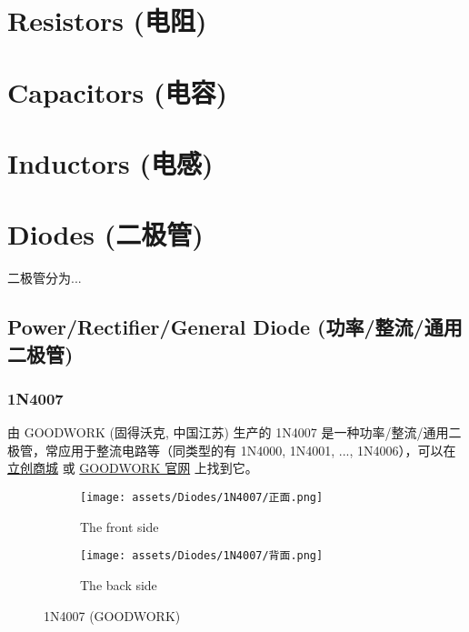 \documentclass[UTF8]{report}
\begin{document}
    \newpage    






\chapter{Resistors (电阻)}\thispagestyle{fancy}


\chapter{Capacitors (电容)}\thispagestyle{fancy}

\chapter{Inductors (电感)}\thispagestyle{fancy}


\chapter{Diodes (二极管)}\thispagestyle{fancy}
二极管分为...

\section{Power/Rectifier/General Diode (功率/整流/通用二极管)}
\subsection{}
\subsection{1N4007}

由 GOODWORK (固得沃克, 中国江苏) 生产的 1N4007 是一种功率/整流/通用二极管，常应用于整流电路等（同类型的有 1N4000, 1N4001, ..., 1N4006），可以在 \href{https://item.szlcsc.com/3428711.html}{立创商城} 或 \href{http://www.gk-goodwork.com/cn/product/1n4007.html}{GOODWORK 官网} 上找到它。
\begin{figure}[H]\centering
\begin{subfigure}[b]{0.5\columnwidth}\centering
    \texttt{[image: assets/Diodes/1N4007/正面.png]}
    \caption{The front side}
\end{subfigure}\hfill
\begin{subfigure}[b]{0.5\columnwidth}\centering
    \texttt{[image: assets/Diodes/1N4007/背面.png]}
    \caption{The back side}
\end{subfigure}
\caption{1N4007 (GOODWORK)}
\end{figure}
\end{document}
